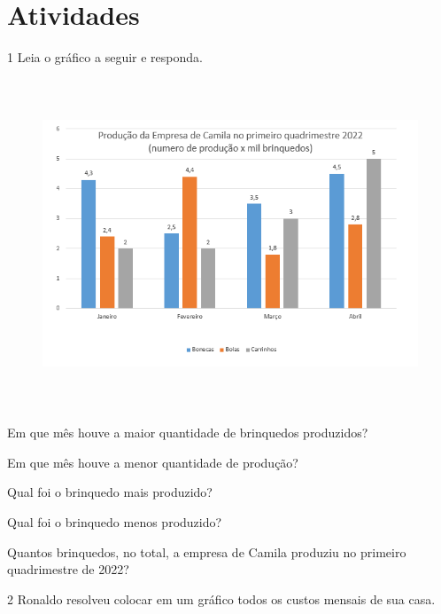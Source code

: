 \section*{Atividades}

\num{1} Leia o gráfico a seguir e responda.

\begin{figure}[H]
\centering\includegraphics[width=5.90625in,height=3.86458in]{./imgSAEB_8_MAT/media/image39.png}
\end{figure}

\begin{escolha}[itemsep=0pt]
\item Em que mês houve a maior quantidade de brinquedos produzidos?

\item Em que mês houve a menor quantidade de produção?

\item Qual foi o brinquedo mais produzido?

\item Qual foi o brinquedo menos produzido?

\item Quantos brinquedos, no total, a empresa de Camila produziu no primeiro quadrimestre de 2022?

\end{escolha}

\num{2} Ronaldo resolveu colocar em um gráfico todos os custos mensais de sua casa.

